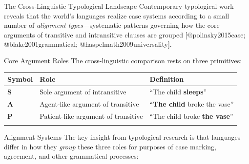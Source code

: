 \documentclass[
  ignorenonframetext,
]{beamer}
\newcounter{none} %
\begin{document}
\begin{frame}{The Cross-Linguistic Typological Landscape}
\protect{}\label{the-cross-linguistic-typological-landscape}
Contemporary typological work reveals that the world's languages realize
case systems according to a small number of \emph{alignment
types}---systematic patterns governing how the core arguments of
transitive and intransitive clauses are grouped {[}@polinsky2015case;
@blake2001grammatical; @haspelmath2009universality{]}.

\begin{block}{Core Argument Roles}
\protect{}\label{core-argument-roles}
The cross-linguistic comparison rests on three primitives:

{\def\LTcaptype{none} %
\begin{longtable}[]{@{}
  >{\centering\arraybackslash}p{}
  >{\raggedright\arraybackslash}p{}
  >{\raggedright\arraybackslash}p{}@{}}
\toprule\noalign{}
\begin{minipage}[b]{\linewidth}\centering
Symbol
\end{minipage} & \begin{minipage}[b]{\linewidth}\raggedright
Role
\end{minipage} & \begin{minipage}[b]{\linewidth}\raggedright
Definition
\end{minipage} \\
\midrule\noalign{}
\endhead
\textbf{S} & Sole argument of intransitive & ``The child
\textbf{sleeps}'' \\
\textbf{A} & Agent-like argument of transitive & ``\textbf{The child}
broke the vase'' \\
\textbf{P} & Patient-like argument of transitive & ``The child broke
\textbf{the vase}'' \\
\bottomrule\noalign{}
\end{longtable}
}
\end{block}

\begin{block}{Alignment Systems}
\protect{}\label{alignment-systems}
The key insight from typological research is that languages differ in
how they \emph{group} these three roles for purposes of case marking,
agreement, and other grammatical processes:


\end{block}
\end{frame}
\end{document}
